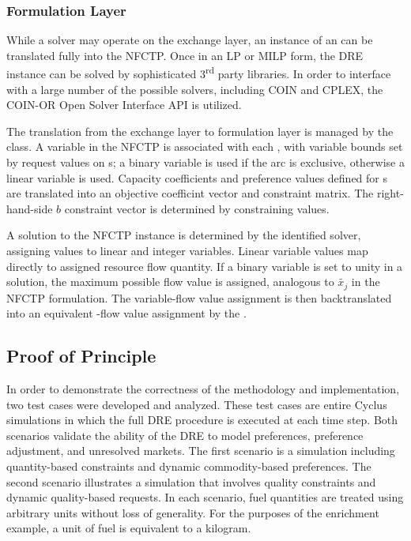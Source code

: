 \subsubsection{Formulation Layer}

While a solver may operate on the exchange layer, an instance of an
 can be translated fully into the NFCTP. Once in an LP or
MILP form, the DRE instance can be solved by sophisticated 3\textsuperscript{rd}
party libraries. In order to interface with a large number of the possible
solvers, including COIN and CPLEX, the COIN-OR Open Solver Interface API
\cite{coinosi} is utilized.

The translation from the exchange layer to formulation layer is managed by the
 class. A variable in the NFCTP is associated with each
, with variable bounds set by request values on
s; a binary variable is used if the arc is exclusive,
otherwise a linear variable is used. Capacity coefficients and preference values
defined for s are translated into an objective coefficint
vector and constraint matrix. The right-hand-side $b$ constraint vector is
determined by  constraining values.

A solution to the NFCTP instance is determined by the identified solver,
assigning values to linear and integer variables. Linear variable values map
directly to assigned resource flow quantity. If a binary variable is set to
unity in a solution, the maximum possible flow value is assigned, analogous to
$\tilde{x_j}$ in the NFCTP formulation. The variable-flow value assignment is
then backtranslated into an equivalent -flow value assignment
by the .

\subsection{Proof of Principle}\label{abm:dre:proof}

In order to demonstrate the correctness of the methodology and implementation,
two test cases were developed and analyzed. These test cases are entire Cyclus
simulations in which the full DRE procedure is executed at each time step. Both
scenarios validate the ability of the DRE to model preferences, preference
adjustment, and unresolved markets. The first scenario is a simulation including
quantity-based constraints and dynamic commodity-based preferences. The second
scenario illustrates a simulation that involves quality constraints and dynamic
quality-based requests. In each scenario, fuel quantities are treated using
arbitrary units without loss of generality. For the purposes of the enrichment
example, a unit of fuel is equivalent to a kilogram.

